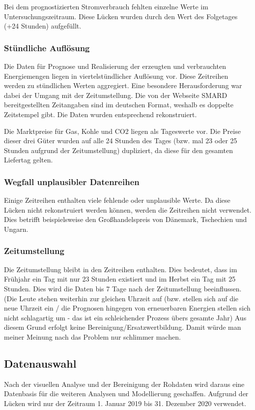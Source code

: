 Bei dem prognostizierten Stromverbrauch fehlten einzelne Werte im Untersuchungszeitraum. Diese Lücken wurden durch den Wert des Folgetages (+24 Stunden) aufgefüllt. 

\subsubsection*{Stündliche Auflösung}
Die Daten für Prognose und Realisierung der erzeugten und verbrauchten Energiemengen liegen in viertelstündlicher Auflösung vor. Diese Zeitreihen werden zu stündlichen Werten aggregiert. Eine besondere Herausforderung war dabei der Umgang mit der Zeitumstellung. Die von der Webseite SMARD bereitgestellten Zeitangaben sind im deutschen Format, weshalb es doppelte Zeitstempel gibt. Die Daten wurden entsprechend rekonstruiert.

Die Marktpreise für Gas, Kohle und CO2 liegen als Tageswerte vor. Die Preise dieser drei Güter wurden auf alle 24 Stunden des Tages (bzw. mal 23 oder 25 Stunden aufgrund der Zeitumstellung) dupliziert, da diese für den gesamten Liefertag gelten. 

\subsubsection*{Wegfall unplausibler Datenreihen}
Einige Zeitreihen enthalten viele fehlende oder unplausible Werte. Da diese Lücken nicht rekonstruiert werden können, werden die Zeitreihen nicht verwendet. Dies betrifft beispielsweise den Großhandelspreis von Dänemark, Tschechien und Ungarn. 

\subsubsection*{Zeitumstellung}
Die Zeitumstellung bleibt in den Zeitreihen enthalten. Dies bedeutet, dass im Frühjahr ein Tag mit nur 23 Stunden existiert und im Herbst ein Tag mit 25 Stunden. Dies wird die Daten bis 7 Tage nach der Zeitumstellung beeinflussen. (Die Leute stehen weiterhin zur gleichen Uhrzeit auf (bzw. stellen sich auf die neue Uhrzeit ein / die Prognosen hingegen von erneuerbaren Energien stellen sich nicht schlagartig um - das ist ein schleichender Prozess übers gesamte Jahr) Aus diesem Grund erfolgt keine Bereinigung/Ersatzwertbildung. Damit würde man meiner Meinung nach das Problem nur schlimmer machen.

\subsection{Datenauswahl}
Nach der visuellen Analyse und der Bereinigung der Rohdaten wird daraus eine Datenbasis für die weiteren Analysen und Modellierung geschaffen. Aufgrund der Lücken wird nur der Zeitraum 1. Januar 2019 bis 31. Dezember 2020 verwendet.


